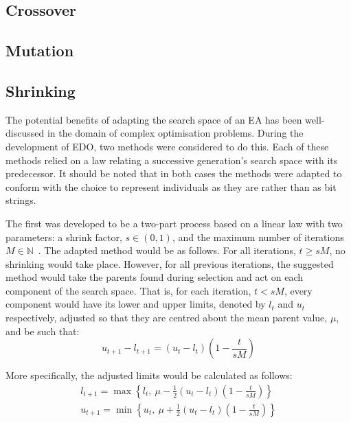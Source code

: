 \subsection{Crossover}



\subsection{Mutation}



\subsection{Shrinking}

The potential benefits of adapting the search space of an EA has been
well-discussed in the domain of complex optimisation problems. During the
development of EDO, two methods were considered to do this. Each of these
methods relied on a law relating a successive generation's search space with its
predecessor. It should be noted that in both cases the methods were adapted to
conform with the choice to represent individuals as they are rather than as bit
strings.

The first was developed to be a two-part process based on a linear law with two
parameters: a shrink factor, \(s \in (0, 1)\), and the maximum number of
iterations \(M \in \mathbb{N}\)~\cite{Amirjanov2017}. The adapted method would
be as follows. For all iterations, \(t \geq sM\), no shrinking would take place.
However, for all previous iterations, the suggested method would take the
parents found during selection and act on each component of the search space.
That is, for each iteration, \(t < sM\), every component would have its lower
and upper limits, denoted by \(l_t\) and \(u_t\) respectively, adjusted so that
they are centred about the mean parent value, \(\mu\), and be such that:
\[
    u_{t+1} - l_{t+1} = (u_t - l_t) \left(1 - \frac{t}{sM}\right)
\]

More specifically, the adjusted limits would be calculated as follows:
\begin{align*}
    l_{t+1} = \max \left\{%
        l_t, \ \mu - \frac{1}{2} (u_t - l_t) \left(1 - \frac{t}{sM}\right)
    \right\}\\
    u_{t+1} = \min \left\{%
        u_t, \ \mu + \frac{1}{2} (u_t - l_t) \left(1 - \frac{t}{sM}\right)
    \right\}
\end{align*}

